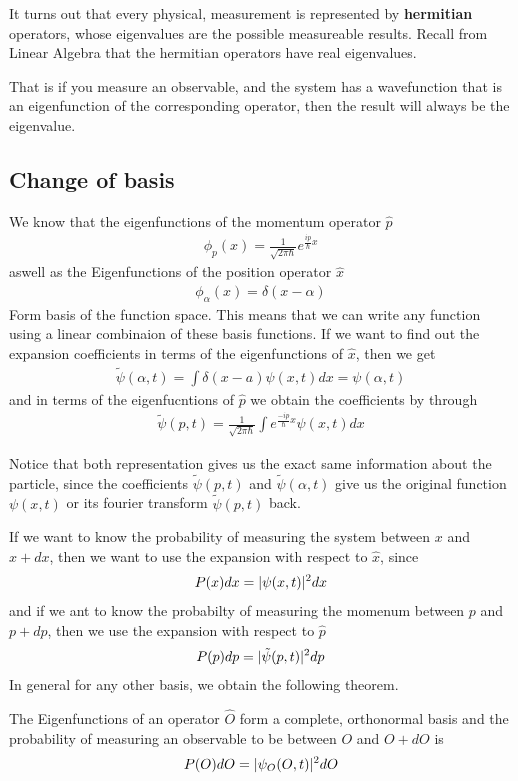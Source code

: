 It turns out that every physical, measurement is represented by \textbf{hermitian}  operators, whose eigenvalues are the possible measureable results.
Recall from Linear Algebra that the hermitian operators have real eigenvalues.

That is if you measure an observable, and the system has a wavefunction that is an eigenfunction of the corresponding operator, then the result will always be the eigenvalue.

\subsection{Change of basis}
We know that the eigenfunctions of the momentum operator $\hat{p}$
\begin{align*}
	\phi_p(x) = \frac{1}{\sqrt{2 \pi \hbar}}e^{\frac{ip}{\hbar}x}
\end{align*}
aswell as the Eigenfunctions of the position operator $\hat{x}$
\begin{align*}
	\phi_{\alpha}(x) = \delta(x-\alpha)
\end{align*}
Form basis of the function space. 
This means that we can write any function using a linear combinaion of these basis functions.
If we want to find out the expansion coefficients in terms of the eigenfunctions of $\hat{x}$, then we get
\begin{align*}
\tilde{\psi}(\alpha,t) = \int \delta(x-a) \psi(x,t) dx = \psi(\alpha,t)
\end{align*}
and in terms of the eigenfucntions of $\hat{p}$ we obtain the coefficients by through
\begin{align*}
\tilde{\psi}(p,t)	= \frac{1}{\sqrt{2 \pi \hbar}} \int e^{\frac{-ip}{\hbar}x} \psi(x,t) dx
\end{align*}

Notice that both representation gives us the exact same information about the particle, since the coefficients $\tilde{\psi}(p,t)$ and $\tilde{\psi}(\alpha,t)$ give us the original function $\psi(x,t)$ or its fourier transform $\tilde{\psi}(p,t)$ back.

If we want to know the probability of measuring the system between $x$ and $x + dx$, then we want to use the expansion with respect to $\hat{x}$, since
\begin{align*}
	P(x) dx = \vert\psi(x,t)\vert^2 dx
\end{align*}
and if we ant to know the probabilty of measuring the momenum between $p$ and $p + dp$, then we use the expansion with respect to $\hat{p}$
\begin{align*}
	P(p) dp = \vert\tilde{\psi}(p,t)\vert^2 dp
\end{align*}
In general for any other basis, we obtain the following theorem.

\begin{ntheorem}
	The Eigenfunctions of an operator $\hat{O}$ form a complete, orthonormal basis and the probability of measuring an observable to be between $O$ and $O + dO$ is
	\begin{align*}
		P(O)dO = \vert\psi_O(O,t)\vert^2 dO
	\end{align*}
\end{ntheorem}

